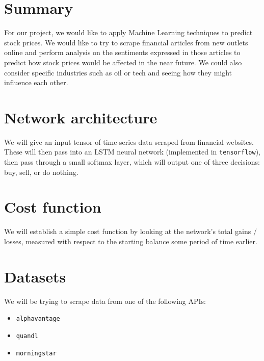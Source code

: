 \documentclass[12pt]{article}
\begin{document}
\section{Summary}
For our project, we would like to apply Machine Learning techniques to
predict stock prices. We would like to try to scrape financial
articles from new outlets online and perform analysis on the
sentiments expressed in those articles to predict how stock prices
would be affected in the near future. We could also consider specific
industries such as oil or tech and seeing how they might influence
each other.

\section{Network architecture}
We will give an input tensor of time-series data scraped from
financial websites. These will then pass into an LSTM neural network
(implemented in \texttt{tensorflow}), then pass through a small
softmax layer, which will output one of three decisions: buy, sell, or
do nothing.

\section{Cost function}
We will establish a simple cost function by looking at the network's
total gains / losses, measured with respect to the starting balance
some period of time earlier.

\section{Datasets}
We will be trying to scrape data from one of the following APIs:
\begin{itemize}
  \item \texttt{alphavantage}
  \item \texttt{quandl}
  \item \texttt{morningstar}
\end{itemize}
\end{document}
